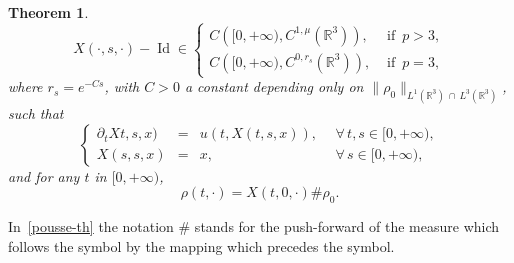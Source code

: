 \documentclass[10pt]{amsart}
\newtheorem{theo}{Theorem}[section]
\theoremstyle{definition}\newtheorem{defi}[theo]{Definition}\newtheorem{rema}[theo]{Remark}\newtheorem{exam}[theo]{Example}\newtheorem{exem}[theo]{Example}\newtheorem{nota}[theo]{Notation}
\newcommand{\R}{\mathbb{R}}
\newcommand{\Id}{\operatorname{Id}}
\let\oldforall\forall
\renewcommand*{\forall}{\mathrel{\oldforall}}
\begin{document}
\begin{theo}
\begin{equation}\label{uflox}
X(\cdot,s,\cdot)-\Id \in
\begin{cases}
C\left([0,+\infty), C^{1,\mu} \left(\R^3\right)\right), & \text{ if } \, p > 3,
\\ {C\left([0,+\infty), C^{0,r_s} \left(\R^3\right)\right),} & \text{ if } \, p =3,
\end{cases}
\end{equation}
where $r_s = e^{-Cs} $, with $C>0$ a constant depending only on $\|\rho_0\|_{L^1(\R^3)\,\cap\,L^3(\R^3)}$, such that
\begin{equation}\label{cflow-def}
\left \{
\begin{array}{rcll}
\partial_t Xt,s,x) & = & u(t, X(t,s,x)),&\: \: \forall \, t,s\in[0,+\infty), \\
X(s,s,x) & = & x,& \: \: \forall \, s \in [0,+\infty),
\end{array}
\right.
\end{equation}
and for any $t$ in $[0,+\infty)$,
\begin{equation}\label{pousse-th}
\rho(t,\cdot) =X(t,0,\cdot) \#\rho_0.
\end{equation}
\end{theo}

In~\eqref{pousse-th} the notation $\#$ stands for the push-forward of the measure which follows the symbol by the mapping which precedes the symbol.
\end{document}
